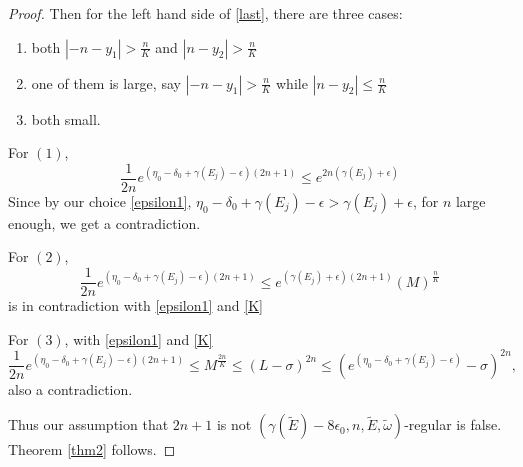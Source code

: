 \begin{proof}
Then for the left hand side of \eqref{last}, there are three cases:
\begin{enumerate}
  \item both $|-n-y_{1}|>\frac{n}{K}$ and $|n-y_{2}|>\frac{n}{K}$
  \item one of them is large, say $|-n-y_{1}|>\frac{n}{K}$ while $|n-y_{2}|\leq\frac{n}{K}$
  \item both small.
\end{enumerate}

For $(1)$,
\[
\frac{1}{2n}e^{(\eta_0-\delta_0+\gamma(E_j)-\epsilon)(2n+1)}\leq e^{2n(\gamma(E_j)+\epsilon)}
\]
Since by our choice \eqref{epsilon1},
 $\eta_0-\delta_0+\gamma(E_j)-\epsilon>\gamma(E_j)+\epsilon$, for $n$ large enough, we get a contradiction.

For $(2)$,
\[
    \frac{1}{2n}e^{(\eta_0-\delta_0+\gamma(E_j)-\epsilon)(2n+1)}
    \leq e^{(\gamma(E_j)+\epsilon)(2n+1)}(M)^{\frac{n}{K}}
\]
is in contradiction with \eqref{epsilon1} and \eqref{K}

For $(3)$, with \eqref{epsilon1} and \eqref{K}
\[
  \frac{1}{2n}e^{(\eta_0-\delta_0+\gamma(E_j)-\epsilon)(2n+1)}\leq M^{\frac{2n}{K}}\leq (L-\sigma)^{2n}\leq(e^{(\eta_0-\delta_0+\gamma(E_j)-\epsilon)}-\sigma)^{2n},
\]
also a contradiction.

Thus our assumption that $2n+1$ is not  $(\gamma(\tilde{E})-8\epsilon_0,n,\tilde{E},\tilde{\omega})$-regular is false. Theorem \ref{thm2} follows.
\end{proof}
